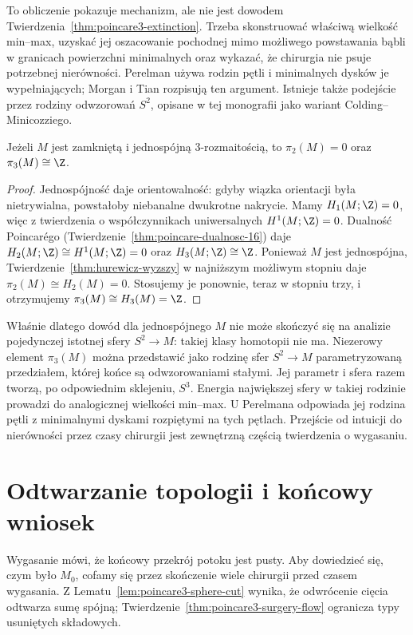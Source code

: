 To obliczenie pokazuje mechanizm, ale nie jest
dowodem Twierdzenia~\ref{thm:poincare3-extinction}.
Trzeba skonstruować właściwą wielkość min--max,
uzyskać jej oszacowanie pochodnej mimo możliwego
powstawania bąbli w granicach powierzchni
minimalnych oraz wykazać, że chirurgia nie
psuje potrzebnej nierówności. Perelman używa
rodzin pętli i minimalnych dysków je wypełniających;
Morgan i Tian rozpisują ten argument. Istnieje
także podejście przez rodziny odwzorowań $S^2$,
opisane w tej monografii jako wariant
Colding--Minicozziego.

\begin{lemat}
\label{lem:poincare3-pi3}
Jeżeli $M$ jest zamkniętą i jednospójną
$3$-rozmaitością, to
$\pi_2(M)=0$ oraz $\pi_3(M)\cong\Z$.
\end{lemat}
\begin{proof}
Jednospójność daje orientowalność: gdyby
wiązka orientacji była nietrywialna, powstałoby
niebanalne dwukrotne nakrycie. Mamy $H_1(M;\Z)=0$,
więc z twierdzenia o współczynnikach
uniwersalnych $H^1(M;\Z)=0$.
Dualność Poincarégo
(Twierdzenie~\ref{thm:poincare-dualnosc-16})
daje $H_2(M;\Z)\cong H^1(M;\Z)=0$
oraz $H_3(M;\Z)\cong\Z$.
Ponieważ $M$ jest jednospójna,
Twierdzenie~\ref{thm:hurewicz-wyzszy}
w najniższym możliwym stopniu daje
$\pi_2(M)\cong H_2(M)=0$.
Stosujemy je ponownie, teraz w stopniu trzy,
i otrzymujemy $\pi_3(M)\cong H_3(M)=\Z$.
\end{proof}

Właśnie dlatego dowód dla jednospójnego $M$
nie może skończyć się na analizie pojedynczej
istotnej sfery $S^2\to M$: takiej klasy
homotopii nie ma. Niezerowy element $\pi_3(M)$
można przedstawić jako rodzinę sfer
$S^2\to M$ parametryzowaną przedziałem,
której końce są odwzorowaniami stałymi.
Jej parametr i sfera razem tworzą, po
odpowiednim sklejeniu, $S^3$.
Energia największej sfery w takiej rodzinie
prowadzi do analogicznej wielkości min--max.
U Perelmana odpowiada jej rodzina pętli
z minimalnymi dyskami rozpiętymi na tych
pętlach. Przejście od intuicji do nierówności
przez czasy chirurgii jest zewnętrzną częścią
twierdzenia o wygasaniu.

\section{Odtwarzanie topologii i końcowy wniosek}
\label{sec:poincare3-topologia}

Wygasanie mówi, że końcowy przekrój potoku jest
pusty. Aby dowiedzieć się, czym było $M_0$,
cofamy się przez skończenie wiele chirurgii
przed czasem wygasania. Z Lematu~\ref{lem:poincare3-sphere-cut}
wynika, że odwrócenie cięcia odtwarza sumę
spójną; Twierdzenie~\ref{thm:poincare3-surgery-flow}
ogranicza typy usuniętych składowych.

